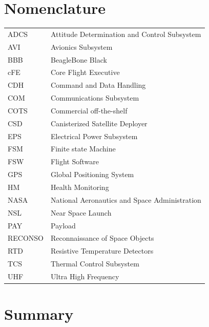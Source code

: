 \documentclass{article}
\begin{document}
\newpage
\section*{\centering Nomenclature}
\vspace{0.5in}
\begin{center}
	\begin{tabular}{l l}
		ADCS 	  &  Attitude Determination and Control Subsystem  \\ 
		AVI    &  Avionics Subsystem     \\ 
		BBB & BeagleBone Black      \\ 
		cFE & Core Flight Executive  \\ 	
		CDH	      & Command and Data Handling  \\ 
		COM     & Communications Subsystem  \\ 
		COTS    & Commercial off-the-shelf   \\ 
		CSD  & Canisterized Satellite Deployer  \\ 
		EPS        & Electrical Power Subsystem   \\ 
		FSM	 & Finite state Machine \\ 
		FSW     & Flight Software   \\ 
		GPS  &  Global Positioning System \\ 
		HM     & Health Monitoring   \\ 
		NASA  & National Aeronautics and Space Administration \\ 
		NSL      &  Near Space Launch   \\ 
		PAY  & Payload \\ 
		RECONSO & Reconnaissance of Space Objects \\
		RTD  & Resistive Temperature Detectors \\ 
		TCS & Thermal Control Subsystem \\ 
		UHF & Ultra High Frequency \\ 
		
		
	\end{tabular}
\end{center}

\newpage
\section*{Summary}
\end{document}
